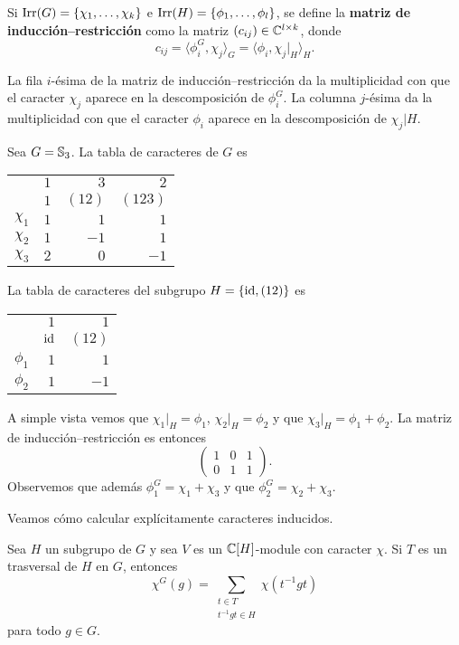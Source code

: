 \begin{definition}
Si $\operatorname{Irr}(G)=\{\chi_1,\dots,\chi_k\}$ e $\operatorname{Irr}(H)=\{\phi_1,\dots,\phi_l\}$, se define
la \textbf{matriz de inducción--restricción} como la matriz $(c_{ij})\in\mathbb{C}^{l\times k}$, donde
\[
c_{ij}=\langle \phi_i^G,\chi_j\rangle_G=\langle\phi_i,\chi_j|_H\rangle_H.
\]
\end{definition}

La fila $i$-ésima de la matriz de inducción--restricción da la multiplicidad con que el caracter $\chi_j$ aparece
en la descomposición de $\phi_i^G$. La columna $j$-ésima da la multiplicidad con que el caracter $\phi_i$ aparece 
en la descomposición de $\chi_j|H$.

\begin{example}
Sea $G=\mathbb{S}_3$. 
La tabla de caracteres de $G$ es 
	\begin{center}
		\begin{tabular}{|c|rrr|}
			\hline
			& $1$ & $3$ & $2$\tabularnewline
			& $1$ & $(12)$ & $(123)$ \tabularnewline
			\hline 
			$\chi_{1}$ & $1$ & $1$ & $1$\tabularnewline
			$\chi_{2}$ & $1$ & $-1$ & $1$ \tabularnewline
			$\chi_{3}$ & $2$ & $0$ & $-1$ \tabularnewline
			\hline
		\end{tabular}
	\end{center}
La tabla de caracteres del subgrupo 
$H=\{\operatorname{id},(12)\}$ es 
\begin{center}
\begin{tabular}{|c|rr|}
\hline 
& $1$ & $1$ \tabularnewline
& $\operatorname{id}$ & $(12)$ \tabularnewline
\hline 
$\phi_{1}$ & $1$ & $1$ \tabularnewline
$\phi_{2}$ & $1$ & $-1$\tabularnewline
\hline
\end{tabular}
\end{center}
A simple vista vemos que $\chi_1|_H=\phi_1$, $\chi_2|_H=\phi_2$ y que $\chi_3|_H=\phi_1+\phi_2$. 
La matriz de inducción--restricción es entonces
\[
\begin{pmatrix}
1 & 0 & 1\\
0 & 1 & 1
\end{pmatrix}.
\]
Observemos que además $\phi_1^G=\chi_1+\chi_3$ y que $\phi_2^G=\chi_2+\chi_3$. 
\end{example}

Veamos cómo calcular explícitamente caracteres inducidos. 

\begin{proposition}
Sea $H$ un subgrupo de $G$ y sea $V$ es un $\mathbb{C}[H]$-module con caracter $\chi$. Si 
$T$ es un trasversal de $H$ en $G$, entonces
\[
\chi^G(g)=\sum_{\substack{t\in T\\t^{-1}gt\in H}}\chi(t^{-1}gt)
\]
para todo $g\in G$. 
\end{proposition}

